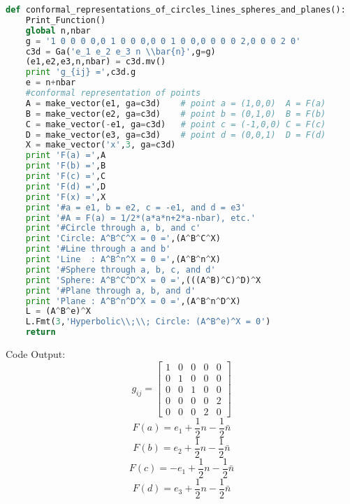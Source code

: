 \documentclass[10pt,fleqn]{report}
\begin{document}
\begin{lstlisting}[language=Python,showspaces=false,showstringspaces=false,backgroundcolor=\color{gray},frame=single]
def conformal_representations_of_circles_lines_spheres_and_planes():
    Print_Function()
    global n,nbar
    g = '1 0 0 0 0,0 1 0 0 0,0 0 1 0 0,0 0 0 0 2,0 0 0 2 0'
    c3d = Ga('e_1 e_2 e_3 n \\bar{n}',g=g)
    (e1,e2,e3,n,nbar) = c3d.mv()
    print 'g_{ij} =',c3d.g
    e = n+nbar
    #conformal representation of points
    A = make_vector(e1, ga=c3d)    # point a = (1,0,0)  A = F(a)
    B = make_vector(e2, ga=c3d)    # point b = (0,1,0)  B = F(b)
    C = make_vector(-e1, ga=c3d)   # point c = (-1,0,0) C = F(c)
    D = make_vector(e3, ga=c3d)    # point d = (0,0,1)  D = F(d)
    X = make_vector('x',3, ga=c3d)
    print 'F(a) =',A
    print 'F(b) =',B
    print 'F(c) =',C
    print 'F(d) =',D
    print 'F(x) =',X
    print '#a = e1, b = e2, c = -e1, and d = e3'
    print '#A = F(a) = 1/2*(a*a*n+2*a-nbar), etc.'
    print '#Circle through a, b, and c'
    print 'Circle: A^B^C^X = 0 =',(A^B^C^X)
    print '#Line through a and b'
    print 'Line  : A^B^n^X = 0 =',(A^B^n^X)
    print '#Sphere through a, b, c, and d'
    print 'Sphere: A^B^C^D^X = 0 =',(((A^B)^C)^D)^X
    print '#Plane through a, b, and d'
    print 'Plane : A^B^n^D^X = 0 =',(A^B^n^D^X)
    L = (A^B^e)^X
    L.Fmt(3,'Hyperbolic\\;\\; Circle: (A^B^e)^X = 0')
    return
\end{lstlisting}
Code Output:
\begin{equation*} g_{ij} = \left[\begin{matrix}1 & 0 & 0 & 0 & 0\\0 & 1 & 0 & 0 & 0\\0 & 0 & 1 & 0 & 0\\0 & 0 & 0 & 0 & 2\\0 & 0 & 0 & 2 & 0\end{matrix}\right] \end{equation*}
\begin{equation*} F(a) =  e_{1} + \frac{1}{2} n - \frac{1}{2} \bar{n} \end{equation*}
\begin{equation*} F(b) =  e_{2} + \frac{1}{2} n - \frac{1}{2} \bar{n} \end{equation*}
\begin{equation*} F(c) = - e_{1} + \frac{1}{2} n - \frac{1}{2} \bar{n} \end{equation*}
\begin{equation*} F(d) =  e_{3} + \frac{1}{2} n - \frac{1}{2} \bar{n} \end{equation*}
\end{document}
